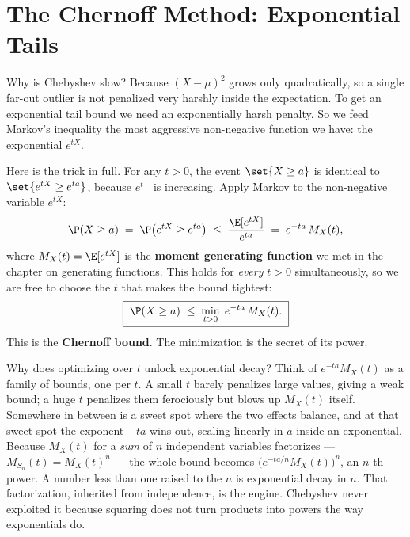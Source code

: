 \section{The Chernoff Method: Exponential Tails}
\label{ch19:chernoff}

Why is Chebyshev slow? Because $(X-\mu)^2$ grows only quadratically, so a
single far-out outlier is not penalized very harshly inside the expectation.
To get an exponential tail bound we need an exponentially harsh penalty. So we
feed Markov's inequality the most aggressive non-negative function we have:
the exponential $e^{tX}$.

Here is the trick in full. For any $t > 0$, the event $\set{X \ge a}$ is
identical to $\set{e^{tX} \ge e^{ta}}$, because $e^{t\,\cdot}$ is increasing.
Apply Markov to the non-negative variable $e^{tX}$:
\[
  \P(X \ge a) \;=\; \P\bigl(e^{tX} \ge e^{ta}\bigr)
  \;\le\; \frac{\E[e^{tX}]}{e^{ta}}
  \;=\; e^{-ta}\,M_X(t),
\]
where $M_X(t) = \E[e^{tX}]$ is the \textbf{moment generating function} we met
in the chapter on generating functions. This holds for \emph{every} $t > 0$
simultaneously, so we are free to choose the $t$ that makes the bound
tightest:
\[
  \boxed{\;\P(X \ge a) \;\le\; \min_{t>0}\; e^{-ta}\,M_X(t).\;}
\]
This is the \textbf{Chernoff bound}. The minimization is the secret of its
power.

\begin{whybox}
Why does optimizing over $t$ unlock exponential decay? Think of $e^{-ta}M_X(t)$
as a family of bounds, one per $t$. A small $t$ barely penalizes large values,
giving a weak bound; a huge $t$ penalizes them ferociously but blows up
$M_X(t)$ itself. Somewhere in between is a sweet spot where the two effects
balance, and at that sweet spot the exponent $-ta$ wins out, scaling linearly
in $a$ inside an exponential. Because $M_X(t)$ for a \emph{sum} of $n$
independent variables factorizes --- $M_{S_n}(t) = M_X(t)^n$ --- the whole
bound becomes $\bigl(e^{-ta/n}M_X(t)\bigr)^n$, an $n$-th power. A number less
than one raised to the $n$ is exponential decay in $n$. That factorization,
inherited from independence, is the engine. Chebyshev never exploited it
because squaring does not turn products into powers the way exponentials do.
\end{whybox}

